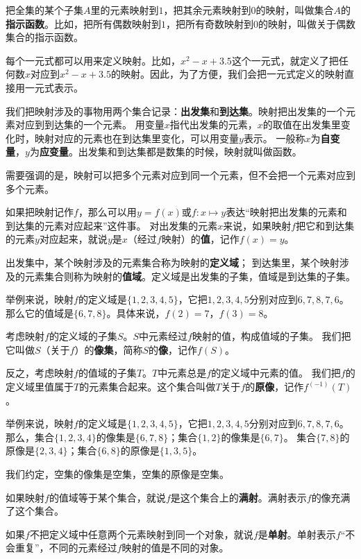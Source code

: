 \documentclass[12pt,UTF8]{ctexbook}
\begin{document}
把全集的某个子集$A$里的元素映射到$1$，把其余元素映射到$0$的映射，叫做集合$A$的\textbf{指示函数}。比如，把所有偶数映射到$1$，把所有奇数映射到$0$的映射，叫做关于偶数集合的指示函数。

每个一元式都可以用来定义映射。比如，$x^2 - x + 3.5$这个一元式，就定义了把任何数$x$对应到$x^2 - x + 3.5$的映射。因此，为了方便，我们会把一元式定义的映射直接用一元式表示。

我们把映射涉及的事物用两个集合记录：\textbf{出发集}和\textbf{到达集}。映射把出发集的一个元素对应到到达集的一个元素。
用变量$x$指代出发集的元素，$x$的取值在出发集里变化时，映射对应的元素也在到达集里变化，可以用变量$y$表示。
一般称$x$为\textbf{自变量}，$y$为\textbf{应变量}。出发集和到达集都是数集的时候，映射就叫做函数。

需要强调的是，映射可以把多个元素对应到同一个元素，但不会把一个元素对应到多个元素。

如果把映射记作$f$，那么可以用$y = f(x)$或$f:x\mapsto y$表达“映射把出发集的元素和到达集的元素对应起来”这件事。
对出发集的元素$x$来说，如果映射$f$把它和到达集的元素$y$对应起来，就说$y$是$x$（经过$f$映射）的\textbf{值}，记作$f(x) = y$。

出发集中，某个映射涉及的元素集合称为映射的\textbf{定义域}；
到达集里，某个映射涉及的元素集合则称为映射的\textbf{值域}。定义域是出发集的子集，值域是到达集的子集。

举例来说，映射$f$的定义域是$\{1,2,3,4,5\}$，它把$1,2,3,4,5$分别对应到$6,7,8,7,6$。
那么它的值域是$\{6,7,8\}$。具体来说，$f(2) = 7$，$f(3) = 8$。

考虑映射$f$的定义域的子集$S$。$S$中元素经过$f$映射的值，构成值域的子集。
我们把它叫做$S$（关于$f$）的\textbf{像集}，简称$S$的\textbf{像}，记作$f(S)$。

反之，考虑映射$f$的值域的子集$T$。$T$中元素总是$f$的定义域中元素的值。
我们把$f$的定义域里值属于$T$的元素集合起来。这个集合叫做$T$关于$f$的\textbf{原像}，记作$f^{(-1)}(T)$。

举例来说，映射$f$的定义域是$\{1,2,3,4,5\}$，它把$1,2,3,4,5$分别对应到$6,7,8,7,6$。
那么，集合$\{1,2,3,4\}$的像集是$\{6,7,8\}$；集合$\{1,2\}$的像集是$\{6,7\}$。
集合$\{7,8\}$的原像是$\{2,3,4\}$；集合$\{6,8\}$的原像是$\{1,3,5\}$。

我们约定，空集的像集是空集，空集的原像是空集。

如果映射$f$的值域等于某个集合，就说$f$是这个集合上的\textbf{满射}。满射表示$f$的像充满了这个集合。

如果$f$不把定义域中任意两个元素映射到同一个对象，就说$f$是\textbf{单射}。单射表示$f$“不会重复”，不同的元素经过$f$映射的值是不同的对象。
\end{document}
